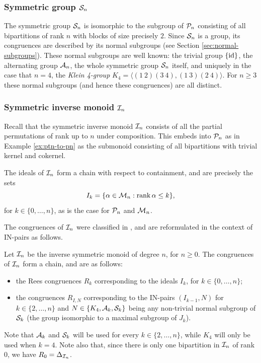 \subsubsection{Symmetric group $\mathcal{S}_n$}
The symmetric group $\mathcal{S}_n$ is isomorphic to the subgroup of $\mathcal{P}_n$
consisting of all bipartitions of rank $n$ with blocks of size precisely $2$.
Since $\mathcal{S}_n$ is a group, its congruences are described by its normal subgroups
(see Section \ref{sec:normal-subgroups}).  These normal subgroups are well
known: the trivial group $\{\operatorname{id}\}$, the alternating group $\mathcal{A}_n$, the whole
symmetric group $\mathcal{S}_n$ itself, and uniquely in the case that $n=4$, the
\textit{Klein 4-group} $K_4 = \langle (1~2)(3~4), (1~3)(2~4) \rangle$.  For
$n \geq 3$ these normal subgroups (and hence these congruences) are all
distinct.

\subsubsection{Symmetric inverse monoid $\mathcal{I}_n$}
Recall that the symmetric inverse monoid $\mathcal{I}_n$ consists of all the partial
permutations of rank up to $n$ under composition.  This embeds into $\mathcal{P}_n$ as
in Example \ref{ex:ptn-to-pn} as the submonoid consisting of all bipartitions
with trivial kernel and cokernel.

The ideals of $\mathcal{I}_n$ form a chain with respect to containment, and are precisely
the sets $$I_k=\{\alpha \in \mathcal{M}_n : \operatorname{rank} \alpha \leq k\},$$ for
$k \in \{0, \ldots, n\}$, as is the case for $\mathcal{P}_n$ and $\mathcal{M}_n$.

The congruences of $\mathcal{I}_n$ were classified in \cite{liber_1953}, and are
reformulated in the context of IN-pairs as follows.
\begin{theorem}
  \label{thm:in-congs}
  Let $\mathcal{I}_n$ be the inverse symmetric monoid of degree $n$, for $n \geq 0$.  The
  congruences of $\mathcal{I}_n$ form a chain, and are as follows:
  \begin{itemize}
  \item the Rees congruences $R_k$ corresponding to the ideals $I_k$, for
    $k \in \{0, \ldots, n\}$;
  \item the congruences $R_{I,N}$ corresponding to the IN-pairs $(I_{k-1}, N)$
    for $k \in \{2, \ldots, n\}$ and $N \in \{K_4, \mathcal{A}_k, \mathcal{S}_k\}$ being any
    non-trivial normal subgroup of $\mathcal{S}_k$ (the group isomorphic to a maximal
    subgroup of $J_k$).
  \end{itemize}
\end{theorem}
Note that $\mathcal{A}_k$ and $\mathcal{S}_k$ will be used for every $k \in \{2, \ldots, n\}$,
while $K_4$ will only be used when $k=4$.  Note also that, since there is only
one bipartition in $\mathcal{I}_n$ of rank $0$, we have $R_0 = \Delta_{\mathcal{I}_n}$.

